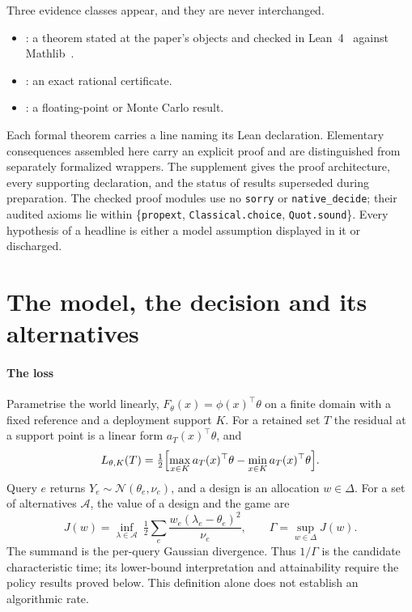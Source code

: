 Three evidence classes appear, and they are never interchanged.
\begin{itemize}
\item \PROVED: a theorem stated at the paper's objects and checked in
Lean~4~\cite{demoura2021} against Mathlib~\cite{mathlib2020}.
\item \CERT: an exact rational certificate.
\item \NUM: a floating-point or Monte Carlo result.
\end{itemize}
Each formal theorem carries a line naming its Lean declaration. Elementary consequences
assembled here carry an explicit proof and are distinguished from separately formalized wrappers. The supplement gives the proof
architecture, every supporting declaration, and the status of results superseded during
preparation. The checked proof modules use no \texttt{sorry} or \texttt{native\_decide};
their audited axioms lie within \{\texttt{propext}, \texttt{Classical.choice}, \texttt{Quot.sound}\}.
Every hypothesis of a headline is either a model assumption displayed in it or discharged.

\section{The model, the decision and its alternatives}
\label{sec:model}

\paragraph{The loss} Parametrise the world linearly, $F_{\theta}(x)=\phi(x)^{\top}\theta$ on a
finite domain with a fixed reference and a deployment support $K$. For a retained set $T$ the
residual at a support point is a linear form $a_{T}(x)^{\top}\theta$, and
\begin{equation}
L_{\theta,K}(T)=\tfrac12\Bigl[\max_{x\in K}a_{T}(x)^{\top}\theta
-\min_{x\in K}a_{T}(x)^{\top}\theta\Bigr].
\label{eq:loss}
\end{equation}
Query $e$ returns $Y_{e}\sim\mathcal N(\theta_{e},\nu_{e})$, and a design is an allocation
$w\in\Delta$. For a set of alternatives $\mathcal A$, the value of a design and the game are
\begin{equation}
J(w)=\inf_{\lambda\in\mathcal A}\ \tfrac12\sum_{e}\frac{w_{e}(\lambda_{e}-\theta_{e})^{2}}{\nu_{e}},
\qquad \Gamma=\sup_{w\in\Delta}J(w).
\label{eq:game}
\end{equation}
The summand is the per-query Gaussian divergence. Thus $1/\Gamma$ is the candidate
characteristic time; its lower-bound interpretation and attainability require the policy
results proved below. This definition alone does not establish an algorithmic rate.

